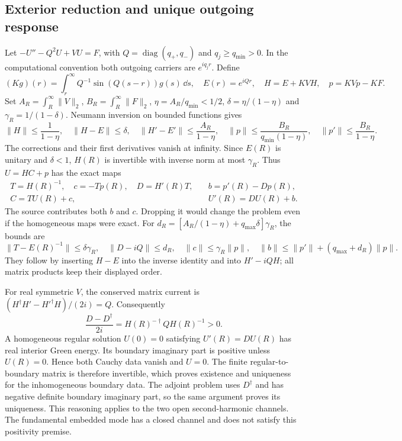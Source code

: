 \subsection{Exterior reduction and unique outgoing response}
Let $-U''-Q^2U+VU=F$, with $Q=\operatorname{diag}(q_+,q_-)$ and
$q_j\geq q_{\min}>0$. In the computational convention both outgoing
carriers are $e^{iq_jr}$. Define
\begin{equation}
 (Kg)(r)=\int_r^\infty Q^{-1}\sin(Q(s-r))g(s)\,\dd s,\quad
 E(r)=e^{iQr},\quad H=E+KVH,\quad p=KVp-KF.
\end{equation}
Set $A_R=\int_R^\infty\|V\|_2$, $B_R=\int_R^\infty\|F\|_2$,
$\eta=A_R/q_{\min}<1/2$, $\delta=\eta/(1-\eta)$ and
$\gamma_R=1/(1-\delta)$. Neumann inversion on bounded functions gives
\begin{equation}
 \|H\|\leq\frac1{1-\eta},\quad \|H-E\|\leq\delta,\quad
 \|H'-E'\|\leq\frac{A_R}{1-\eta},\quad
 \|p\|\leq\frac{B_R}{q_{\min}(1-\eta)},\quad
 \|p'\|\leq\frac{B_R}{1-\eta}.
\end{equation}
The corrections and their first derivatives vanish at infinity.
Since $E(R)$ is unitary and $\delta<1$, $H(R)$ is invertible with
inverse norm at most $\gamma_R$. Thus $U=HC+p$ has the exact maps
\begin{equation}
 \begin{aligned}
 T=H(R)^{-1},\quad c=-Tp(R),\quad D=H'(R)T,\quad
 &b=p'(R)-Dp(R),\\
 C=TU(R)+c,\qquad &U'(R)=DU(R)+b.
 \end{aligned}
\end{equation}
The source contributes both $b$ and $c$. Dropping it would change the
problem even if the homogeneous maps were exact.
For $d_R=[A_R/(1-\eta)+q_{\max}\delta]\gamma_R$, the bounds are
\begin{equation}
 \|T-E(R)^{-1}\|\leq\delta\gamma_R,\quad
 \|D-iQ\|\leq d_R,\quad
 \|c\|\leq\gamma_R\|p\|,\quad
 \|b\|\leq\|p'\|+(q_{\max}+d_R)\|p\|.
\end{equation}
They follow by inserting $H-E$ into the inverse identity and into
$H'-iQH$; all matrix products keep their displayed order.

For real symmetric $V$, the conserved matrix current is
$(H^\dagger H'-H'^\dagger H)/(2i)=Q$. Consequently
\begin{equation}
 \frac{D-D^\dagger}{2i}=H(R)^{-\dagger}QH(R)^{-1}>0.
\end{equation}
A homogeneous regular solution $U(0)=0$ satisfying $U'(R)=DU(R)$
has real interior Green energy. Its boundary imaginary part is positive
unless $U(R)=0$. Hence both Cauchy data vanish and $U=0$.
The finite regular-to-boundary matrix is therefore invertible, which
proves existence and uniqueness for the inhomogeneous boundary data.
The adjoint problem uses $D^\dagger$ and has negative definite boundary
imaginary part, so the same argument proves its uniqueness.
This reasoning applies to the two open second-harmonic channels.
The fundamental embedded mode has a closed channel and does not satisfy
this positivity premise.

